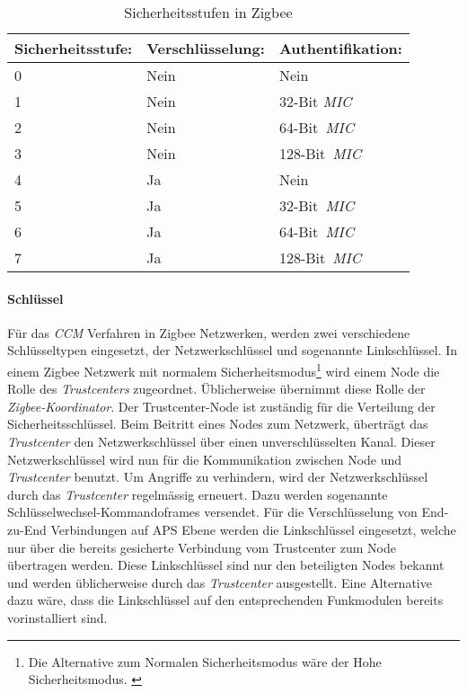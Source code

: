 \begin{table}[h]
\centering
\begin{tabular}{lll} 
\toprule
Sicherheitsstufe: & Verschlüsselung: & Authentifikation: \\ 
\hline
0 & Nein & Nein \\
1 & Nein & 32-Bit \textit{MIC} \\
2 & Nein & 64-Bit~\textit{MIC} \\
3 & Nein & 128-Bit~\textit{MIC} \\
4 & Ja & Nein \\
5 & Ja & 32-Bit~\textit{MIC} \\
6 & Ja & 64-Bit~\textit{MIC} \\
7 & Ja & 128-Bit~\textit{MIC} \\
\bottomrule
\end{tabular}
\caption{Sicherheitsstufen in Zigbee \cite[S.~334]{markus_krause_rainer_konrad_zigbee_2014}}
\label{tab:SicherheitsstufeninZigbee}
\end{table}

\paragraph{Schlüssel}
Für das \textit{CCM} Verfahren in Zigbee Netzwerken, werden zwei verschiedene Schlüsseltypen eingesetzt, der Netzwerkschlüssel und sogenannte Linkschlüssel.
In einem Zigbee Netzwerk mit normalem Sicherheitsmodus\footnote{Die Alternative zum Normalen Sicherheitsmodus wäre der Hohe Sicherheitsmodus. \cite[S.~338]{markus_krause_rainer_konrad_zigbee_2014}} wird einem Node die Rolle des \textit{Trustcenters} zugeordnet.
Üblicherweise übernimmt diese Rolle der \textit{Zigbee-Koordinator}.
Der Trustcenter-Node ist zuständig für die Verteilung der Sicherheitsschlüssel.
Beim Beitritt eines Nodes zum Netzwerk, überträgt das \textit{Trustcenter} den Netzwerkschlüssel über einen unverschlüsselten Kanal.
Dieser Netzwerkschlüssel wird nun für die Kommunikation zwischen Node und \textit{Trustcenter} benutzt.
Um Angriffe zu verhindern, wird der Netzwerkschlüssel durch das \textit{Trustcenter} regelmässig erneuert.
Dazu werden sogenannte Schlüsselwechsel-Kommandoframes versendet.
Für die Verschlüsselung von End-zu-End Verbindungen auf APS Ebene werden die Linkschlüssel eingesetzt, welche nur über die bereits gesicherte Verbindung vom Trustcenter zum Node übertragen werden.
Diese Linkschlüssel sind nur den beteiligten Nodes bekannt und werden üblicherweise durch das \textit{Trustcenter} ausgestellt.
Eine Alternative dazu wäre, dass die Linkschlüssel auf den entsprechenden Funkmodulen bereits vorinstalliert sind.

